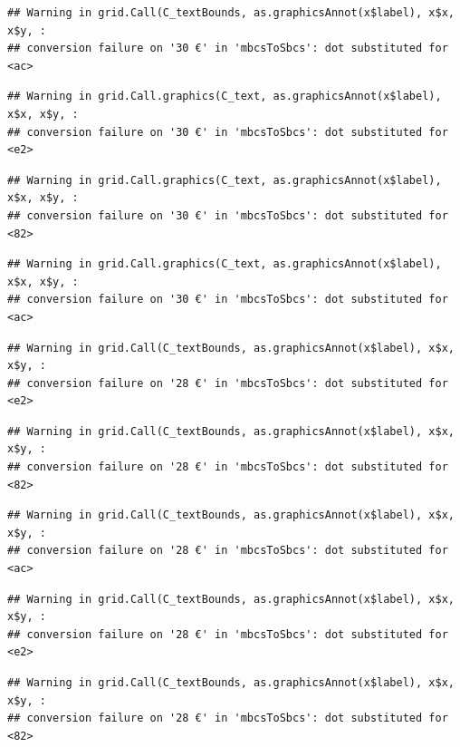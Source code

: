 \documentclass[
]{article}
\begin{document}
\begin{verbatim}
## Warning in grid.Call(C_textBounds, as.graphicsAnnot(x$label), x$x, x$y, :
## conversion failure on '30 €' in 'mbcsToSbcs': dot substituted for <ac>
\end{verbatim}

\begin{verbatim}
## Warning in grid.Call.graphics(C_text, as.graphicsAnnot(x$label), x$x, x$y, :
## conversion failure on '30 €' in 'mbcsToSbcs': dot substituted for <e2>
\end{verbatim}

\begin{verbatim}
## Warning in grid.Call.graphics(C_text, as.graphicsAnnot(x$label), x$x, x$y, :
## conversion failure on '30 €' in 'mbcsToSbcs': dot substituted for <82>
\end{verbatim}

\begin{verbatim}
## Warning in grid.Call.graphics(C_text, as.graphicsAnnot(x$label), x$x, x$y, :
## conversion failure on '30 €' in 'mbcsToSbcs': dot substituted for <ac>
\end{verbatim}

\begin{verbatim}
## Warning in grid.Call(C_textBounds, as.graphicsAnnot(x$label), x$x, x$y, :
## conversion failure on '28 €' in 'mbcsToSbcs': dot substituted for <e2>
\end{verbatim}

\begin{verbatim}
## Warning in grid.Call(C_textBounds, as.graphicsAnnot(x$label), x$x, x$y, :
## conversion failure on '28 €' in 'mbcsToSbcs': dot substituted for <82>
\end{verbatim}

\begin{verbatim}
## Warning in grid.Call(C_textBounds, as.graphicsAnnot(x$label), x$x, x$y, :
## conversion failure on '28 €' in 'mbcsToSbcs': dot substituted for <ac>
\end{verbatim}

\begin{verbatim}
## Warning in grid.Call(C_textBounds, as.graphicsAnnot(x$label), x$x, x$y, :
## conversion failure on '28 €' in 'mbcsToSbcs': dot substituted for <e2>
\end{verbatim}

\begin{verbatim}
## Warning in grid.Call(C_textBounds, as.graphicsAnnot(x$label), x$x, x$y, :
## conversion failure on '28 €' in 'mbcsToSbcs': dot substituted for <82>
\end{verbatim}
\end{document}
